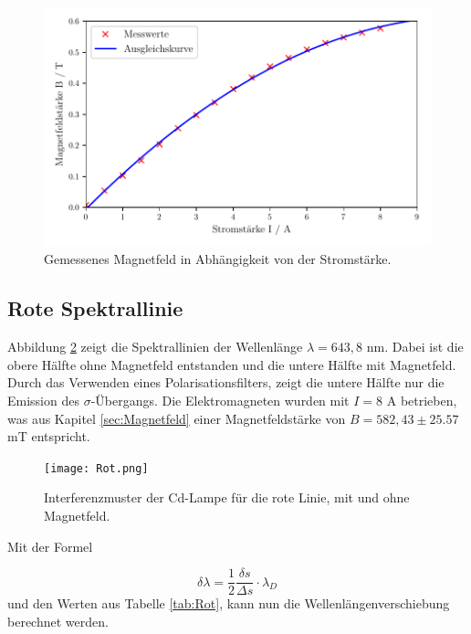 \begin{figure}[H]
  \centering
  \includegraphics[scale=0.65]{Magnetfeld.pdf}
  \vspace{-10pt}
  \caption{Gemessenes Magnetfeld in Abhängigkeit von der Stromstärke.}
  \label{fig:Magnetfeld}
\end{figure}


\subsection{Rote Spektrallinie}
Abbildung \ref{fig:rot} zeigt die Spektrallinien der Wellenlänge $\lambda = 643,8$ nm. Dabei ist die obere Hälfte ohne Magnetfeld 
entstanden und die untere Hälfte mit Magnetfeld. Durch das Verwenden eines Polarisationsfilters, zeigt die untere Hälfte nur die Emission des $\sigma$-Übergangs. 
Die Elektromagneten wurden mit $I = 8$ A betrieben, was aus Kapitel \ref{sec:Magnetfeld} 
einer Magnetfeldstärke von $B = 582,43 \pm 25.57$ mT entspricht.

\begin{figure}[H]
  \centering
  \texttt{[image: Rot.png]}
  \vspace{-10pt}
  \caption{Interferenzmuster der Cd-Lampe für die rote Linie, mit und ohne Magnetfeld.}
  \label{fig:rot}
\end{figure}

Mit der Formel 

\begin{equation}
  \label{equ:Wellenlänge}
  \delta \lambda = \frac{1}{2} \frac{\delta s}{\Delta s} \cdot \lambda_D
\end{equation}
und den Werten aus Tabelle \ref{tab:Rot}, kann nun die Wellenlängenverschiebung berechnet werden.

